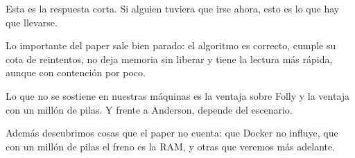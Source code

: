 Esta es la respuesta corta. Si alguien tuviera que irse ahora, esto es lo que hay que llevarse.

Lo importante del paper sale bien parado: el algoritmo es correcto, cumple su cota de reintentos, no deja memoria sin liberar y tiene la lectura más rápida, aunque con contención por poco.

Lo que no se sostiene en nuestras máquinas es la ventaja sobre Folly y la ventaja con un millón de pilas. Y frente a Anderson, depende del escenario.

Además descubrimos cosas que el paper no cuenta: que Docker no influye, que con un millón de pilas el freno es la RAM, y otras que veremos más adelante.
